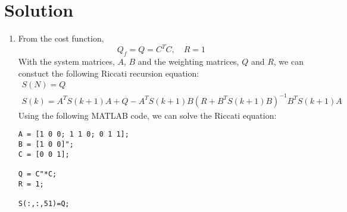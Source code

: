 \documentclass[10pt,a4paper,oneside]{article}
\begin{document}
\section*{Solution}
\begin{enumerate}
\item From the cost function,
\[
Q_{f}=Q=C^{T} C, \quad R=1
\]
With the system matrices, $A$, $B$ and the weighting matrices, $Q$ and $R$, we can constuct the following Riccati recursion equation:
\[
\begin{array}{l}{S(N)=Q} \\ {S(k)=A^{T} S(k+1) A+Q-A^{T} S(k+1) B\left(R+B^{T} S(k+1) B\right)^{-1} B^{T} S(k+1) A}\end{array}
\]
Using the following MATLAB code, we can solve the Riccati equation:
\begin{lstlisting}
A = [1 0 0; 1 1 0; 0 1 1];
B = [1 0 0]";
C = [0 0 1];

Q = C"*C;
R = 1;

S(:,:,51)=Q;


\end{lstlisting}
\end{enumerate}
\end{document}

